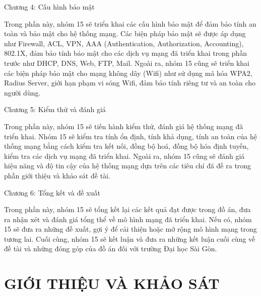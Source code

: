 \documentclass[12pt, a4paper]{article}
\begin{document}
	\hspace{0.75cm}Chương 4: Cấu hình bảo mật\par
	\hspace{0.75cm}Trong phần này, nhóm 15 sẽ triển khai các cấu hình bảo mật để đảm bảo tính an toàn và bảo mật cho hệ thống mạng. Các biện pháp bảo mật sẽ được áp dụng như Firewall, ACL, VPN, AAA (Authentication, Authorization, Accounting), 802.1X, đảm bảo tính bảo mật cho các dịch vụ mạng đã triển khai trong phần trước như DHCP, DNS, Web, FTP, Mail. Ngoài ra, nhóm 15 cũng sẽ triển khai các biện pháp bảo mật cho mạng không dây (Wifi) như sử dụng mã hóa WPA2, Radius Server, giới hạn phạm vi sóng Wifi, đảm bảo tính riêng tư và an toàn cho người dùng.\par
	\hspace{0.75cm}Chương 5: Kiểm thử và đánh giá\par
	\hspace{0.75cm}Trong phần này, nhóm 15 sẽ tiến hành kiểm thử, đánh giá hệ thống mạng đã triển khai. Nhóm 15 sẽ kiểm tra tính ổn định, tính khả dụng, tính an toàn của hệ thống mạng bằng cách kiểm tra kết nối, đồng bộ hoá, đồng bộ hóa định tuyến, kiểm tra các dịch vụ mạng đã triển khai. Ngoài ra, nhóm 15 cũng sẽ đánh giá hiệu năng và độ tin cậy của hệ thống mạng dựa trên các tiêu chí đã đề ra trong phần giới thiệu và khảo sát đề tài.\par
	\hspace{0.75cm}Chương 6: Tổng kết và đề xuất\par
	\hspace{0.75cm}Trong phần này, nhóm 15 sẽ tổng kết lại các kết quả đạt được trong đồ án, đưa ra nhận xét và đánh giá tổng thể về mô hình mạng đã triển khai. Nếu có, nhóm 15 sẽ đưa ra những đề xuất, gợi ý để cải thiện hoặc mở rộng mô hình mạng trong tương lai. Cuối cùng, nhóm 15 sẽ kết luận và đưa ra những kết luận cuối cùng về đề tài và những đóng góp của đồ án đối với trường Đại học Sài Gòn. \par
	\newpage
	
	\begin{center}
		\tableofcontents
	\end{center}
	
	\newpage
	\listoftables
	
	\listoffigures
	
	\newpage
	\section{GIỚI THIỆU VÀ KHẢO SÁT}
\end{document}
